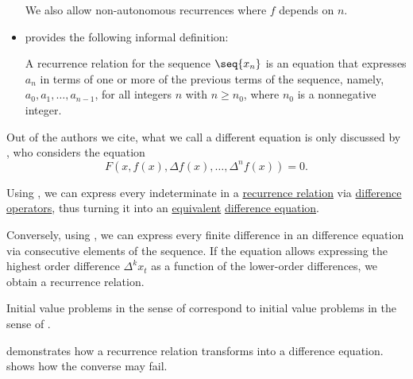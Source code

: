\begin{remark}
\begin{itemize}
    We also allow non-autonomous recurrences where \( f \) depends on \( n \).

    \item {} provides the following informal definition:
    \begin{displayquote}
      A recurrence relation for the sequence \( \seq{ x_n } \) is an equation that expresses \( a_n \) in terms of one or more of the previous terms of the sequence, namely, \( a_0, a_1, \ldots, a_{n-1} \), for all integers \( n \) with \( n \geq n_0 \), where \( n_0 \) is a nonnegative integer.
    \end{displayquote}
  \end{itemize}

  Out of the authors we cite, what we call a different equation is only discussed by , who considers the equation
  \begin{equation*}
    F(x, f(x), \Delta f(x), \ldots, \Delta^n f(x)) = 0.
  \end{equation*}
\end{remark}

\begin{proposition}\label{thm:recurrence_relations_and_difference_equations}
  Using , we can express every indeterminate in a \hyperref[def:recurrence_relation]{recurrence relation} via \hyperref[def:finite_difference_operator]{difference operators}, thus turning it into an \hyperref[def:equation/equivalent]{equivalent} \hyperref[def:difference_equation]{difference equation}.

  Conversely, using , we can express every finite difference in an difference equation via consecutive elements of the sequence. If the equation allows expressing the highest order difference \( \Delta^k x_t \) as a function of the lower-order differences, we obtain a recurrence relation.
\end{proposition}
\begin{comments}
  \item Initial value problems in the sense of  correspond to initial value problems in the sense of .

  \item {} demonstrates how a recurrence relation transforms into a difference equation.  shows how the converse may fail.
\end{comments}

